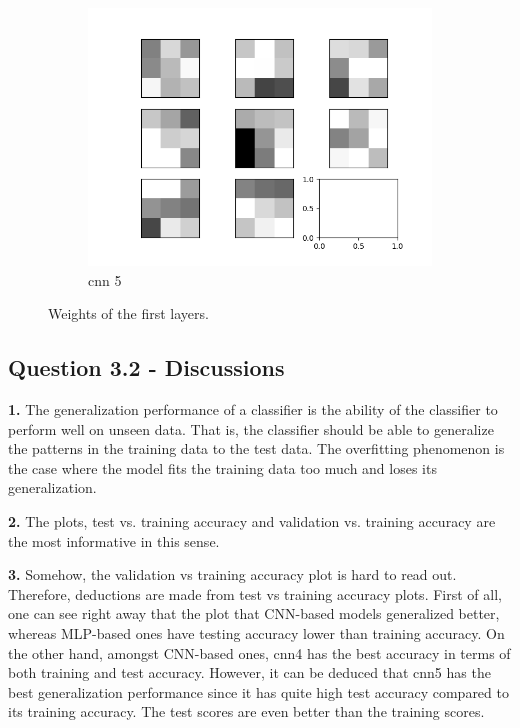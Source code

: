 \documentclass{assignment}
\begin{document}
\begin{figure}[!htb]
\begin{subfigure}{0.3\textwidth}
        \includegraphics[width=\textwidth]{figures/weights_cnn_5.png}
        \caption{cnn 5}
    \end{subfigure}\hfill
    \caption{Weights of the first layers.}
    \label{fig:weights}
\end{figure}

\subsection*{Question 3.2 - Discussions}

\textbf{1.}
The generalization performance of a classifier is the ability of the classifier to perform well on unseen data. That is, the classifier should be able to generalize the patterns in the training data to the test data. The overfitting phenomenon is the case where the model fits the training data too much and loses its generalization.

\textbf{2.}
\noindent The plots, test vs. training accuracy and validation vs. training accuracy are the most informative in this sense.


\textbf{3.}
\noindent Somehow, the validation vs training accuracy plot is hard to read out. Therefore, deductions are made from test vs training accuracy plots. First of all, one can see right away that the plot that CNN-based models generalized better, whereas MLP-based ones have testing accuracy lower than training accuracy. On the other hand, amongst CNN-based ones, cnn4 has the best accuracy in terms of both training and test accuracy. However, it can be deduced that cnn5 has the best generalization performance since it has quite high test accuracy compared to its training accuracy. The test scores are even better than the training scores. 
\end{document}
